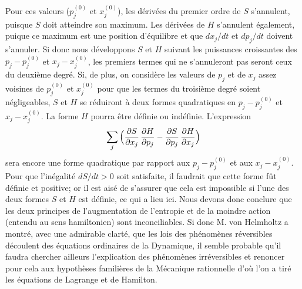 \medskip
{\cit  Pour ces valeurs ($p_j^{(0)}$ et $x_j^{(0)}$), les d\'eriv\'ees du
premier ordre de $S$ s'annulent, puisque $S$ doit atteindre son maximum. 
Les d\'eriv\'ees de $H$ s'annulent \'egalement, puique ce maximum est une 
position d'\'equilibre et que $dx_j / dt$ et $dp_j / dt$ doivent s'annuler. 
\smallskip
Si donc nous d\'eveloppons $S$ et $H$ suivant les puissances croissantes 
des $p_j - p_j^{(0)}$ et $x_j - x_j^{(0)}$, les premiers termes qui ne 
s'annuleront pas seront ceux du deuxi\`eme degr\'e. Si, de plus, on 
consid\`ere les valeurs de $p_j$ et de $x_j$ assez voisines de $p_j^{(0)}$ 
et $x_j^{(0)}$ pour que les termes du troisi\`eme degr\'e soient 
n\'egligeables, $S$ et $H$ se r\'eduiront \`a deux formes quadratiques en 
$p_j - p_j^{(0)}$ et $x_j - x_j^{(0)}$.
\smallskip
La forme $H$ pourra \^etre d\'efinie ou ind\'efinie. L'expression 
$$\sum_j \Big( {\partial S \over \partial x_j}\, {\partial H \over 
\partial p_j} - {\partial S \over \partial p_j}\, {\partial H \over 
\partial x_j}\Big)$$
sera encore une forme quadratique par rapport aux $p_j - p_j^{(0)}$ 
et aux $x_j - x_j^{(0)}$. 
\smallskip
Pour que l'in\'egalit\'e $dS / dt > 0$ soit satisfaite, il faudrait que 
cette forme f\^ut d\'efinie et positive; or il est ais\'e de s'assurer 
que cela est impossible si l'une des deux formes $S$ et $H$ est d\'efinie, 
ce qui a lieu ici. 
\smallskip
Nous devons donc conclure que les deux principes de l'augmentation de 
l'entropie et de la moindre action (entendu au sens hamiltonien) sont 
inconciliables. Si donc M. von Helmholtz a montr\'e, avec une admirable 
clart\'e, que les lois des ph\'enom\`enes r\'eversibles d\'ecoulent des 
\'equations ordinaires de la Dynamique, il semble probable qu'il faudra 
chercher ailleurs l'explication des ph\'enom\`enes irr\'eversibles et 
renoncer pour cela aux hypoth\`eses famili\`eres de la M\'ecanique 
rationnelle d'o\`u l'on a tir\'e les \'equations de Lagrange et de 
Hamilton. \par  }

\bigskip

